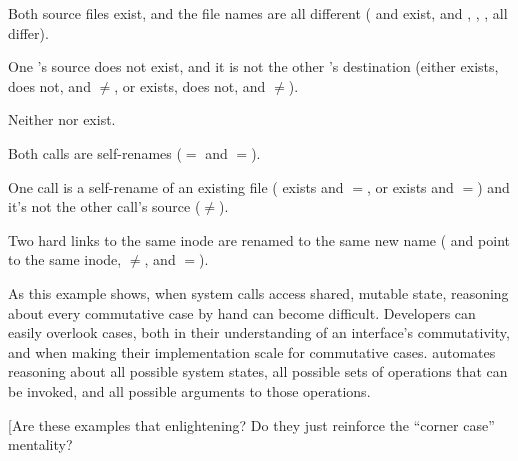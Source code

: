 \begin{CompactItemize}
\item Both source files exist, and the file names are all different
      ( and  exist, and , , ,
       all differ).

\item One 's source does not exist, and it is not the
      other 's destination (either
       exists,  does not, and $\neq$, or
       exists,  does not, and $\neq$).

\item Neither  nor  exist.

\item Both calls are self-renames ($=$ and $=$).

\item One call is a self-rename of an existing file
      ( exists and $=$, or
        exists and $=$) and
      it's not the other call's source ($\neq$).

\item Two hard links to the same inode are renamed to the same new name
      ( and  point to the same inode,
       $\neq$, and $=$).

\end{CompactItemize}

As this example shows, when system calls access shared, mutable
state, reasoning about every commutative case by hand can become
difficult.
%
\cbstart Developers can easily overlook cases, both in their
understanding of an interface's commutativity, and when making their
implementation scale for commutative cases. \cbend
%
\analyzer
automates reasoning about all possible system states, all possible
sets of operations that can be
invoked, and all possible arguments to those operations.

\XXX[AC][Are these examples that enlightening?  Do they just reinforce
the ``corner case'' mentality?

